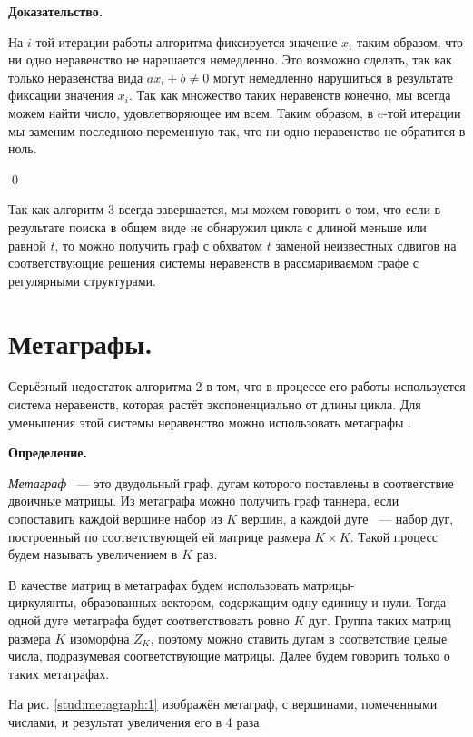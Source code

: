 \documentclass[14pt]{mmcs_article}
\begin{document}
\textbf{Доказательство.}

На $i$-той итерации работы алгоритма фиксируется значение $x_i$ таким образом, что ни одно неравенство не нарешается немедленно. Это возможно сделать, так как только неравенства вида $ax_i + b \neq 0$ могут немедленно нарушиться в результате фиксации значения $x_i$. Так как множество таких неравенств конечно, мы всегда можем найти число, удовлетворяющее им всем. Таким образом, в $e$-той итерации мы заменим последнюю переменную так, что ни одно неравенство не обратится в ноль. 

\qed

Так как алгоритм 3 всегда завершается, мы можем говорить о том, что если в результате поиска в общем виде не обнаружил цикла с длиной меньше или равной $t$, то можно получить граф с обхватом $t$ заменой неизвестных сдвигов на соответствующие решения системы неравенств в рассмариваемом графе с регулярными структурами.

\newpage
\section{Метаграфы.}

Серьёзный недостаток алгоритма 2 в том, что в процессе его работы используется система неравенств, которая растёт экспоненциально от длины цикла. Для уменьшения этой системы неравенство можно использовать метаграфы \cite{metagraphs}.

\textbf{Определение.}

\textsl{Метаграф} ~--- это двудольный граф, дугам которого поставлены в соответствие двоичные матрицы. Из метаграфа можно получить граф таннера, если сопоставить каждой вершине набор из $K$ вершин, а каждой дуге ~--- набор дуг, построенный по соответствующей ей матрице размера $K \times K$. Такой процесс будем называть увеличением в $K$ раз. 

В качестве матриц в метаграфах будем использовать матрицы-\\циркулянты, образованных вектором, содержащим одну единицу и нули. Тогда одной дуге метаграфа будет соответствовать ровно $K$ дуг. Группа таких матриц размера $K$ изоморфна $Z_K$, поэтому можно ставить дугам в соответствие целые числа, подразумевая соответствующие матрицы. Далее будем говорить только о таких метаграфах.

На рис. \ref{stud:metagraph:1} изображён метаграф, с вершинами, помеченными числами, и результат увеличения его в 4 раза.
\end{document}
